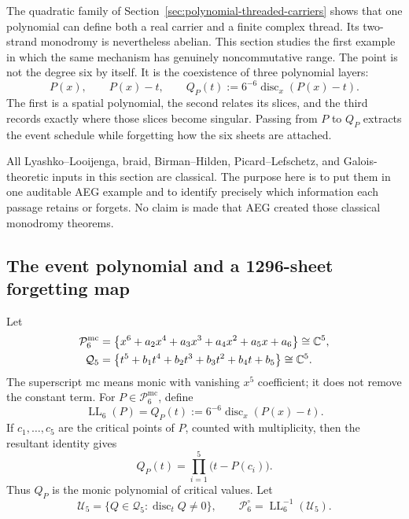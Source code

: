 The quadratic family of Section~\ref{sec:polynomial-threaded-carriers}
shows that one polynomial can define both a real carrier and a finite complex
thread.  Its two-strand monodromy is nevertheless abelian.  This section studies
the first example in which the same mechanism has genuinely noncommutative
range.  The point is not the degree six by itself.  It is the coexistence of
three polynomial layers:
\begin{equation}
 P(x),
 \qquad
 P(x)-t,
 \qquad
 Q_P(t):=6^{-6}\operatorname{disc}_x(P(x)-t).
 \label{eq:sextic-three-polynomial-layers}
\end{equation}
The first is a spatial polynomial, the second relates its slices, and the third
records exactly where those slices become singular.  Passing from $P$ to $Q_P$
extracts the event schedule while forgetting how the six sheets are attached.

All Lyashko--Looijenga, braid, Birman--Hilden, Picard--Lefschetz, and
Galois-theoretic inputs in this section are classical.  The purpose here is to
put them in one auditable AEG example and to identify precisely which
information each passage retains or forgets.  No claim is made that AEG
created those classical monodromy theorems.

\subsection{The event polynomial and a 1296-sheet forgetting map}

Let
\begin{align}
 \mathcal P_6^{\mathrm{mc}}
 &=\left\{
 x^6+a_2x^4+a_3x^3+a_4x^2+a_5x+a_6
 \right\}\cong\mathbb{C}^5,
 \label{eq:monic-centered-sextic-space}\\
 \mathcal Q_5
 &=\left\{
 t^5+b_1t^4+b_2t^3+b_3t^2+b_4t+b_5
 \right\}\cong\mathbb{C}^5.
 \label{eq:monic-quintic-event-space}
\end{align}
The superscript $\mathrm{mc}$ means monic with vanishing $x^5$ coefficient;
it does not remove the constant term.  For $P\in\mathcal P_6^{\mathrm{mc}}$,
define
\begin{equation}
 \operatorname{LL}_6(P)=Q_P(t)
 :=6^{-6}\operatorname{disc}_x(P(x)-t).
 \label{eq:sextic-ll-map}
\end{equation}
If $c_1,\ldots,c_5$ are the critical points of $P$, counted with
multiplicity, then the resultant identity gives
\begin{equation}
 Q_P(t)=\prod_{i=1}^5\bigl(t-P(c_i)\bigr).
 \label{eq:event-polynomial-critical-values}
\end{equation}
Thus $Q_P$ is the monic polynomial of critical values.  Let
\begin{equation}
 \mathcal U_5
 =\{Q\in\mathcal Q_5:\operatorname{disc}_tQ\ne0\},
 \qquad
 \mathcal P_6^\circ=\operatorname{LL}_6^{-1}(\mathcal U_5).
 \label{eq:ll-regular-loci}
\end{equation}

